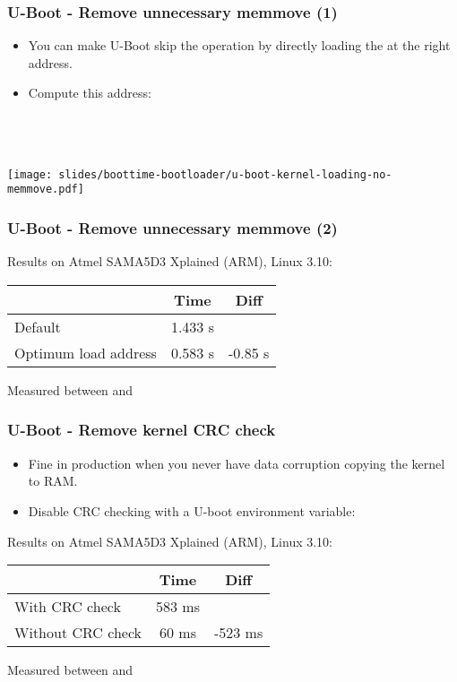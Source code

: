 \begin{frame}
\frametitle{U-Boot - Remove unnecessary memmove (1)}
\begin{itemize}
\item You can make U-Boot skip the  operation
      by directly loading the  at the right
      address.
\item Compute this address: \\
      {\small
      \\
      \\ 
      \\
      }
\end{itemize}
\begin{center}
    \texttt{[image: slides/boottime-bootloader/u-boot-kernel-loading-no-memmove.pdf]}
\end{center}
\end{frame}

\begin{frame}
\frametitle{U-Boot - Remove unnecessary memmove (2)}
Results on Atmel SAMA5D3 Xplained (ARM), Linux 3.10:
\newline\newline
\begin{tabular}{| l || c | c |}
\hline
& Time & Diff \\
\hline
Default & 1.433 s & \\
Optimum load address & 0.583 s & -0.85 s\\
\hline
\end{tabular}
\newline\newline
\small
Measured between  and 
\end{frame}

\begin{frame}
\frametitle{U-Boot - Remove kernel CRC check}
\begin{itemize}
\item Fine in production when you never have data corruption
      copying the kernel to RAM.
\item Disable CRC checking with a U-boot environment variable:\\
\end{itemize}
Results on Atmel SAMA5D3 Xplained (ARM), Linux 3.10:
\newline\newline
\begin{tabular}{| l || c | c |}
\hline
& Time & Diff \\
\hline
With CRC check & 583 ms & \\
Without CRC check & 60 ms & -523 ms \\
\hline
\end{tabular}
\newline\newline
\small
Measured between  and 
\end{frame}

